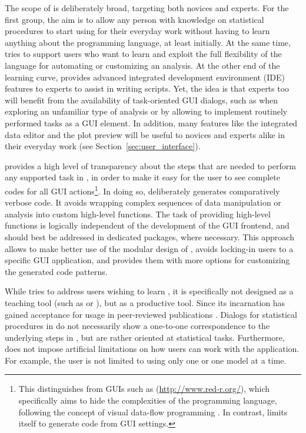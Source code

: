 The scope of  is deliberately broad, targeting both  novices and experts.
For the first group, the aim is to allow any person with knowledge on
statistical procedures to start using  for their everyday work 
without having to learn anything about the  programming language,
at least initially. At the same time,  tries to support users who want to learn and
exploit the full flexibility of the  language for automating or customizing
an analysis. At the other end of the learning curve,  provides advanced integrated development environment (IDE)
features to  experts to assist in writing  scripts. Yet, the idea
is that  experts too will benefit from the availability of task-oriented GUI
dialogs, such as when exploring an unfamiliar type of analysis
or by allowing to implement routinely performed tasks as a GUI element. In
addition, many features like the integrated data editor and the plot preview 
will be useful to  novices and  experts alike in their everyday work
(see Section~\ref{sec:user_interface}).

 provides a high level of transparency about the steps that are needed to
perform any supported task in , in order to make it easy for the user to see
complete codes for all GUI actions\footnote{
  This distinguishes  from  GUIs such as  (\url{http://www.red-r.org/}), which 
  specifically aims to hide the complexities of the  programming language, following the concept of visual data-flow 
  programming \citep{Sutherland1966}. In contrast,  limits itself to generate  code from GUI settings.
}. In doing so,  deliberately generates
comparatively verbose code. It avoids wrapping complex sequences of data
manipulation or analysis into custom high-level  functions. The task of
providing high-level functions is logically independent of the development of the
GUI frontend, and should best be addressed in dedicated  packages, where necessary.
This approach allows to make better use of the modular design of , avoids
locking-in users to a specific GUI application, and provides them with more options for
customizing the generated code patterns.

While  tries to address users wishing to learn , it is specifically not
designed as a teaching tool (such as  or ), but as
a productive tool. Since its incarnation  has gained acceptance for usage in peer-reviewed 
publications \citep{Zou2008, Zou2009, Rugg-Gunn2010, Yang2011, Roediger2011}.
Dialogs for statistical procedures in  do not
necessarily show a one-to-one correspondence to the underlying steps in , but are
rather oriented at statistical tasks. Furthermore,  does not impose
artificial limitations on how users can work with the application. For example,
the user is not limited to using only one  or one model at a
time.

